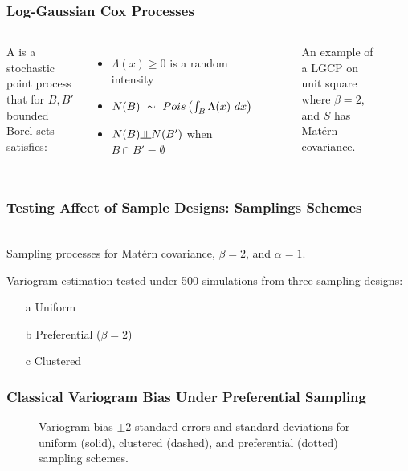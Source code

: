 \documentclass[xcolor=svgnames]{beamer}
\begin{document}
\begin{frame}
\frametitle{Log-Gaussian Cox Processes}

\begin{columns}[l]

\column{.05in}
\column{2.45in}
A  is a stochastic point process that for $B, B'$ bounded Borel sets satisfies:
\begin{itemize}
\item $\Lambda(x) \geq 0$ is a random intensity
\item $N(B)~\sim~\Pois{\int_B \Lambda(x) \ dx}$
\item $N(B) \indep N(B')$ when $B \cap B' = \emptyset$
\end{itemize}

\column{2.45in}

\begin{figure}
\centering
{}
\caption{An example of a LGCP on unit square where $\beta=2$, and $S$ has Mat\'{e}rn covariance.}
\end{figure}

\column{.05in}

\end{columns}

\end{frame}
\begin{frame}
\frametitle{Testing Affect of Sample Designs: Samplings Schemes}
\begin{center}
\centering
{}
\\{\footnotesize Sampling processes for Mat\'{e}rn covariance, $\beta=2$, and $\alpha=1$.}
\end{center}
Variogram estimation tested under 500 simulations from three sampling designs:
\begin{enumerate}
\item[a] Uniform
\item[b] Preferential ($\beta=2$)
\item[c] Clustered
\end{enumerate}

\end{frame}
\begin{frame}
\frametitle{Classical Variogram Bias Under Preferential Sampling}
\begin{figure}
\centering
\vspace{-.0in}
\vspace{-.0in}
\caption{Variogram bias $\pm$2 standard errors and standard deviations for uniform (solid), clustered (dashed), and preferential (dotted) sampling schemes.}
\end{figure}

\end{frame}
\end{document}

